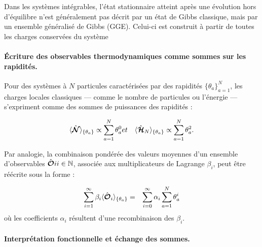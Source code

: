 Dans les systèmes intégrables, l’état stationnaire atteint après une évolution hors d’équilibre n’est généralement pas décrit par un état de Gibbs classique, mais par un ensemble généralisé de Gibbs (GGE). Celui-ci est construit à partir de toutes les charges conservées du système

\paragraph{Écriture des observables thermodynamiques comme sommes sur les rapidités.}

Pour des systèmes à $N$ particules caractérisées par des rapidités $\{ \theta_a \}_{a = 1}^N$, les charges locales classiques — comme le nombre de particules ou l’énergie — s’expriment comme des sommes de puissances des rapidités :

\begin{eqnarray*}
	\langle \hat{\bm{\mathcal{N}}} \rangle_{\{ \theta_a\} } \propto \sum_{a = 1}^N \theta_a^0  & et & \langle \hat{\bm{\mathcal{H}}}_N \rangle_{\{ \theta_a\} } \propto \sum_{a = 1}^N \theta_a^2 .	
\end{eqnarray*}

Par analogie, la combinaison pondérée des valeurs moyennes d’un ensemble d’observables ${ \hat{\bm{\mathcal{O}}}i }{i \in \mathbb{N}}$, associée aux multiplicateurs de Lagrange ${ \beta_i }$, peut être réécrite sous la forme :

\begin{eqnarray}
	\sum_{i = 1}^\infty  \beta_i \langle \hat{\bm{\mathcal{O}}}_i \rangle_{ \{\theta_a \} } & = & \sum_{i = 0}^\infty \alpha_i \sum_{a = 1 }^N \theta_a^i		
\end{eqnarray}
où les coefficients $\alpha_i$ résultent d’une recombinaison des $\beta_i$.

\paragraph{Interprétation fonctionnelle et échange des sommes.}
	
